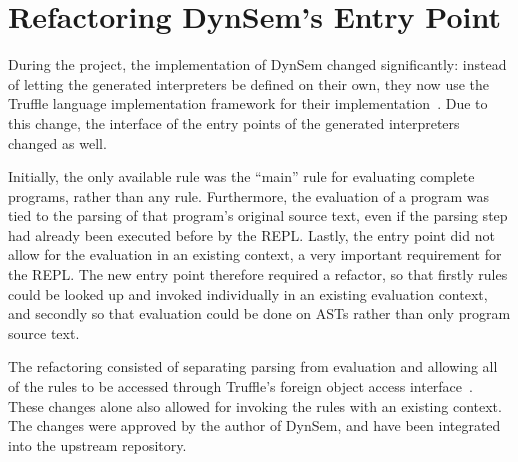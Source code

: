 \section{Refactoring DynSem's Entry Point}
\label{sec:dynsem-refactor}
During the project, the implementation of DynSem changed significantly:
instead of letting the generated interpreters be defined on their own, they now
use the Truffle language implementation framework for their
implementation~\cite{Humer14}. Due to this change, the interface of the entry
points of the generated interpreters changed as well.

Initially, the only available rule was the ``main'' rule for evaluating complete
programs, rather than any rule. Furthermore, the evaluation of a program was
tied to the parsing of that program's original source text, even if the parsing
step had already been executed before by the REPL. Lastly, the entry point did
not allow for the evaluation in an existing context, a very important
requirement for the REPL. The new entry point therefore required a refactor, so
that firstly rules could be looked up and invoked individually in an existing
evaluation context, and secondly so that evaluation could be done on ASTs rather
than only program source text.

The refactoring consisted of separating parsing from evaluation and allowing all
of the rules to be accessed through Truffle's foreign object access
interface~\cite{Grimmer15}. These changes alone also allowed for invoking the
rules with an existing context. The changes were approved by the author of
DynSem, and have been integrated into the upstream repository.

